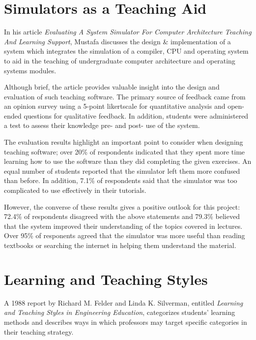 \documentclass[bsc,twoside,singlespacing,parskip,logo,notimes,normalheadings]{infthesis}
\begin{document}
    \section{Simulators as a Teaching Aid}

    In his article {\em Evaluating A System Simulator For Computer
      Architecture Teaching And Learning Support}\cite{mustafa2010},
    Mustafa discusses the design \& implementation of a system
    which integrates the simulation of a compiler, CPU and operating
    system to aid in the teaching of undergraduate computer
    architecture and operating systems modules.

    Although brief, the article provides valuable insight into the
    design and evaluation of such teaching software. The primary
    source of feedback came from an opinion survey using a 5-point
    \gls{likertscale} for quantitative analysis and open-ended questions
    for qualitative feedback. In addition, students were administered
    a test to assess their knowledge pre- and post- use of the system.

    The evaluation results highlight an important point to consider
    when designing teaching software; over 20\% of respondents
    indicated that they spent more time learning how to use the
    software than they did completing the given exercises. An equal
    number of students reported that the simulator left them more
    confused than before. In addition, 7.1\% of respondents said that
    the simulator was too complicated to use effectively in their
    tutorials.

    However, the converse of these results gives a positive outlook
    for this project: 72.4\% of respondents disagreed with the above
    statements and 79.3\% believed that the system improved their
    understanding of the topics covered in lectures. Over 95\% of
    responents agreed that the simulator was more useful than reading
    textbooks or searching the internet in helping them understand the
    material.

    \section{Learning and Teaching Styles}

    A 1988 report by Richard M. Felder and Linda K. Silverman,
    entitled {\em Learning and Teaching Styles in Engineering
      Education}\cite{felder1988}, categorizes students' learning
    methods and describes ways in which professors may target specific
    categories in their teaching strategy.
\end{document}
